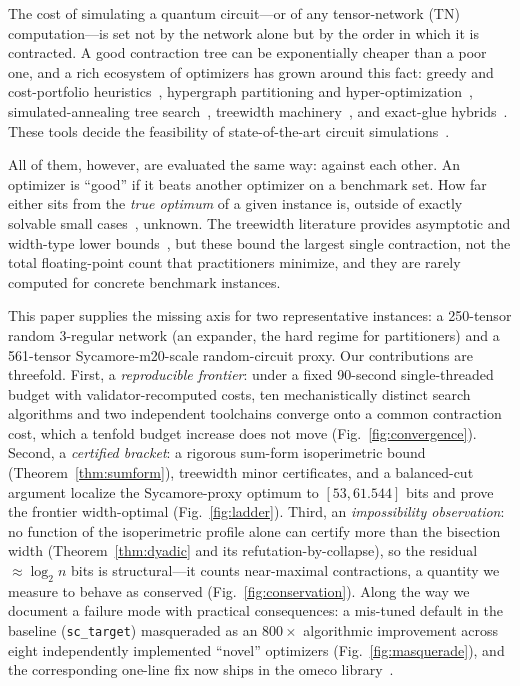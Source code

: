\documentclass[a4paper,11pt,noarxiv]{quantumarticle}
\begin{document}
The cost of simulating a quantum circuit---or of any tensor-network (TN)
computation---is set not by the network alone but by the order in which it is
contracted. A good contraction tree can be exponentially cheaper than a poor
one, and a rich ecosystem of optimizers has grown around this fact: greedy and
cost-portfolio heuristics~\cite{orgler_2024_optimizing,pfeifer_2013_faster},
hypergraph partitioning and hyper-optimization~\cite{gray_2020_hyper},
simulated-annealing tree search~\cite{kalachev_2021_multi,anon_2025_optimizing},
treewidth machinery~\cite{markov_2005_simulating,dumitrescu_2018_benchmarking},
and exact-glue hybrids~\cite{ibrahim_2022_constructing,staudt_2024_improved}.
These tools decide the feasibility of state-of-the-art circuit
simulations~\cite{liu_2022_verifying}.

All of them, however, are evaluated the same way: against each other. An
optimizer is ``good'' if it beats another optimizer on a benchmark set. How far
either sits from the \emph{true optimum} of a given instance is, outside of
exactly solvable small cases~\cite{pfeifer_2013_faster}, unknown. The
treewidth literature provides asymptotic and width-type lower
bounds~\cite{markov_2005_simulating}, but these bound the largest single
contraction, not the total floating-point count that practitioners minimize,
and they are rarely computed for concrete benchmark instances.

This paper supplies the missing axis for two representative instances: a
250-tensor random 3-regular network (an expander, the hard regime for
partitioners) and a 561-tensor Sycamore-m20-scale random-circuit proxy. Our
contributions are threefold. First, a \emph{reproducible frontier}: under a
fixed 90-second single-threaded budget with validator-recomputed costs, ten
mechanistically distinct search algorithms and two independent toolchains
converge onto a common contraction cost, which a tenfold budget increase does
not move (Fig.~\ref{fig:convergence}). Second, a \emph{certified bracket}: a
rigorous sum-form isoperimetric bound (Theorem~\ref{thm:sumform}), treewidth
minor certificates, and a balanced-cut argument localize the Sycamore-proxy
optimum to $[53, 61.544]$ bits and prove the frontier width-optimal
(Fig.~\ref{fig:ladder}). Third, an \emph{impossibility observation}: no
function of the isoperimetric profile alone can certify more than the
bisection width (Theorem~\ref{thm:dyadic} and its refutation-by-collapse), so
the residual $\approx\log_2 n$ bits is structural---it counts near-maximal
contractions, a quantity we measure to behave as conserved
(Fig.~\ref{fig:conservation}). Along the way we document a failure mode with
practical consequences: a mis-tuned default in the baseline
(\texttt{sc\_target}) masqueraded as an $800\times$ algorithmic improvement
across eight independently implemented ``novel'' optimizers
(Fig.~\ref{fig:masquerade}), and the corresponding one-line fix now ships in
the \textsf{omeco} library~\cite{omeco}.
\end{document}

